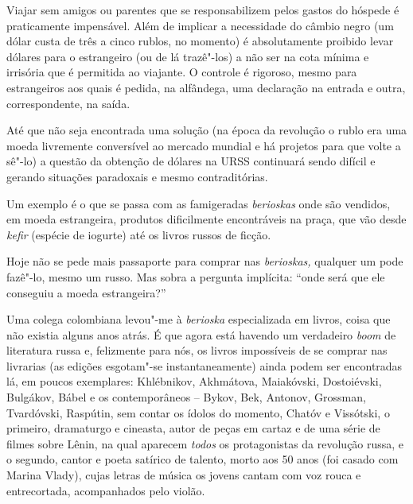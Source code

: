 Viajar sem amigos ou parentes que se responsabilizem pelos gastos do
hóspede é praticamente impensável. Além de implicar a necessidade do
câmbio negro (um dólar custa de três a cinco rublos, no momento) é
absolutamente proibido levar dólares para o estrangeiro (ou de lá
trazê"-los) a não ser na cota mínima e irrisória que é permitida ao
viajante. O controle é rigoroso, mesmo para estrangeiros aos quais é
pedida, na alfândega, uma declaração na entrada e outra, correspondente,
na saída.

Até que não seja encontrada uma solução (na época da revolução o rublo
era uma moeda livremente conversível ao mercado mundial e há projetos
para que volte a sê"-lo) a questão da obtenção de dólares na URSS
continuará sendo difícil e gerando situações paradoxais e mesmo
contraditórias.

Um exemplo é o que se passa com as famigeradas \emph{berioskas} onde são
vendidos, em moeda estrangeira, produtos dificilmente encontráveis na
praça, que vão desde \emph{kefir} (espécie de iogurte) até os livros
russos de ficção.

Hoje não se pede mais passaporte para comprar nas \emph{berioskas,}
qualquer um pode fazê"-lo, mesmo um russo. Mas sobra a pergunta
implícita: ``onde será que ele conseguiu a moeda estrangeira?''

Uma colega colombiana levou"-me à \emph{berioska} especializada em
livros, coisa que não existia alguns anos atrás. É que agora está
havendo um verdadeiro \emph{boom} de literatura russa e, felizmente para
nós, os livros impossíveis de se comprar nas livrarias (as edições
esgotam"-se instantaneamente) ainda podem ser encontradas lá, em poucos
exemplares: Khlébnikov, Akhmátova, Maiakóvski, Dostoiévski, Bulgákov,
Bábel e os contemporâneos -- Bykov, Bek, Antonov, Grossman, Tvardóvski,
Raspútin, sem contar os ídolos do momento, Chatóv e Vissótski, o
primeiro, dramaturgo e cineasta, autor de peças em cartaz e de uma série
de filmes sobre Lênin, na qual aparecem \emph{todos} os protagonistas da
revolução russa, e o segundo, cantor e poeta satírico de talento, morto
aos 50 anos (foi casado com Marina Vlady), cujas letras de música os
jovens cantam com voz rouca e entrecortada, acompanhados pelo violão.

